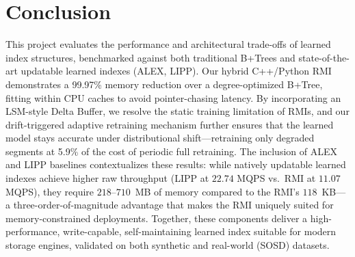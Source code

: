 \documentclass[10pt,twocolumn,a4paper]{article}
\begin{document}
\section{Conclusion}
This project evaluates the performance and architectural trade-offs of learned index structures, benchmarked against both traditional B+Trees and state-of-the-art updatable learned indexes (ALEX, LIPP). Our hybrid C++/Python RMI demonstrates a 99.97\% memory reduction over a degree-optimized B+Tree, fitting within CPU caches to avoid pointer-chasing latency. By incorporating an LSM-style Delta Buffer, we resolve the static training limitation of RMIs, and our drift-triggered adaptive retraining mechanism further ensures that the learned model stays accurate under distributional shift---retraining only degraded segments at 5.9\% of the cost of periodic full retraining. The inclusion of ALEX and LIPP baselines contextualizes these results: while natively updatable learned indexes achieve higher raw throughput (LIPP at $22.74$ MQPS vs.\ RMI at $11.07$ MQPS), they require $218$--$710$~MB of memory compared to the RMI's $118$~KB---a three-order-of-magnitude advantage that makes the RMI uniquely suited for memory-constrained deployments. Together, these components deliver a high-performance, write-capable, self-maintaining learned index suitable for modern storage engines, validated on both synthetic and real-world (SOSD) datasets.



\end{document}
